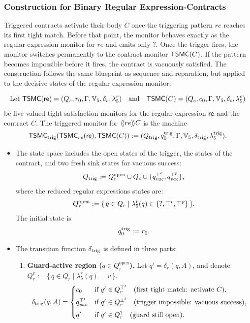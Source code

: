 \subsubsection*{Construction for Binary Regular Expression-Contracts}
Triggered contracts activate their body $C$ once the triggering pattern $re$
reaches its first tight match. Before that point, the monitor behaves exactly as the regular-expression monitor for
$re$ and emits only $\mathsf{?}$. Once the trigger fires, the monitor switches permanently to the contract monitor $\tsmc(C)$. If the pattern becomes impossible before it fires, the contract is
vacuously satisfied. The construction follows the same blueprint as sequence and reparation, but applied to the decisive states of the regular expression monitor.

\begin{definition}
    \label{def:moore-trigger-seq}
    
    \[\text{Let }
    \tsmc(\re)=(Q_r, r_0, \Gamma, \tightverdicts, \delta_r, \lambda_5^r)
    \quad\text{and}\quad
    \tsmc(C)=(Q_c, c_0, \Gamma, \tightverdicts, \delta_c, \lambda_5^c)
    \]
    be five-valued tight satisfaction monitors for the regular expression $\re$ and the contract $C$.
    The triggered monitor for $\trig[re]{C}$ is the machine
    \[
    \tsmc_{\trigg}(\tsmc_{re}(\re),\tsmc(C))
      := (Q_{\trigg}, q_0^{\trigg}, \Gamma, \tightverdicts, \delta_{\trigg}, \lambda_5^{\trigg}).
    \]
    
    \begin{itemize}
      \item The state space includes the open states of the trigger, the states of the contract, and two fresh sink states for vacuous success:
      \[
         Q_{\trigg} := Q_r^{\text{open}} \cup Q_c \cup \{q_{\mathit{vac}}^{\topt}, q_{\mathit{vac}}^{\topp}\},
      \]
      where the reduced regular expressions states are:
      \[
         Q_r^{\text{open}}
         := \{\,q \in Q_r \mid \lambda_5^r(q)\in\{\mathsf{?},\topt,\topp\}\,\}.
      \]
      The initial state is
      \[
        q_0^{\trigg} := r_0.
      \]
    
      \item The transition function $\delta_{\trigg}$ is defined in three parts:
    
      \begin{enumerate}
          \item 
      \textbf{Guard-active region ($q\in Q_r^{\text{open}}$).}
      Let $q'=\delta_r(q,A)$, and denote $Q_r^{v} := \{\,q \in Q_r \mid \lambda_5^r(q) = v\,\}$.
      \[
      \delta_{\trigg}(q,A)=
      \begin{cases}
        c_0
          & \text{if } q'\in Q_r^{\topt}
            \quad\text{(first tight match: activate } C\text{)},\\[4pt]
        q_{\mathit{vac}}^{\topt}
          & \text{if } q'\in Q_r^{\bott}
            \quad\text{(trigger impossible: vacuous success)},\\[4pt]
        q'
          & \text{if } q'\in Q_r^{?}
            \quad\text{(guard still open)}.
      \end{cases}
      \]
      

\end{enumerate}
\end{itemize}
\end{definition}
